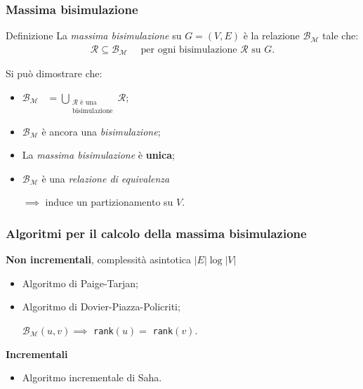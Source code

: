 \documentclass{beamer}
\begin{document}
\begin{frame}\frametitle{Massima bisimulazione}
    \begin{block}{Definizione}
        La \emph{massima bisimulazione} su $G = (V,E)$ è la relazione $\mathcal{B}_\mathcal{M}$ tale che:
        \begin{gather*}
            \mathcal{R} \subseteq \mathcal{B}_\mathcal{M} \quad \text{ per ogni bisimulazione } \mathcal{R} \text{ su } G.
        \end{gather*}
    \end{block}

    \bigskip\bigskip

    Si può dimostrare che:
    \begin{itemize}
        \item $\displaystyle \mathcal{B}_\mathcal{M} \,\,\,\,\,= \bigcup_{\substack{\mathcal{R} \text{ è una}\\\text{bisimulazione}}} \mathcal{R}$;
        \item $\mathcal{B}_\mathcal{M}$ è ancora una \emph{bisimulazione};
        \item La \emph{massima bisimulazione} è \textbf{unica};
        \item $\mathcal{B}_\mathcal{M}$ è una \emph{relazione di equivalenza}

        $\implies$ induce un partizionamento su $V$.
    \end{itemize}
\end{frame}

\begin{frame}\frametitle{Algoritmi per il calcolo della massima bisimulazione}
    \textbf{Non incrementali}, complessità asintotica $|E| \log |V|$
    \begin{itemize}
        \item Algoritmo di Paige-Tarjan;
        \item Algoritmo di Dovier-Piazza-Policriti;

        \qquad $\mathcal{B}_\mathcal{M}(u,v) \implies$ \texttt{rank}$(u) =$ \texttt{rank}$(v)$.
    \end{itemize}

    \bigskip

    \textbf{Incrementali}
    \begin{itemize}
        \item Algoritmo incrementale di Saha.
    \end{itemize}
\end{frame}
\end{document}
